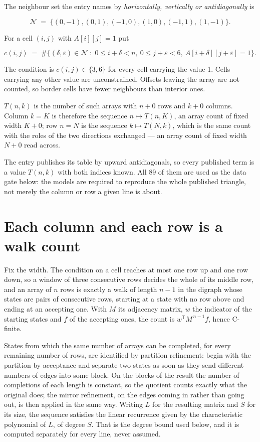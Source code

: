 \documentclass[11pt]{article}
\theoremstyle{definition}
\begin{document}
The neighbour set the entry names by {\itshape horizontally, vertically or antidiagonally} is

\[\mathcal{N} \;=\; \{(0,-1), (0,1), (-1,0), (1,0), (-1,1), (1,-1)\}.\]

For a cell $(i,j)$ with $A[i][j] = 1$ put

\[c(i,j) \;=\; \#\bigl\{(\delta,\varepsilon)\in\mathcal{N} \;:\; 0\le i+\delta<n,\ 0\le j+\varepsilon<6,\ A[i+\delta][j+\varepsilon] = 1\bigr\}.\]

The condition is $c(i,j) \in \{3, 6\}$ for every cell carrying the value 1. Cells carrying any other value are unconstrained. Offsets leaving the array are not counted, so border cells have fewer neighbours than interior ones.

$T(n,k)$ is the number of such arrays with $n + 0$ rows and $k + 0$ columns. Column $k = K$ is therefore the sequence $n \mapsto T(n,K)$, an array count of fixed width $K + 0$; row $n = N$ is the sequence $k \mapsto T(N,k)$, which is the same count with the roles of the two directions exchanged --- an array count of fixed width $N + 0$ read across.

The entry publishes its table by upward antidiagonals, so every published term is a value $T(n,k)$ with both indices known. All 89 of them are used as the data gate below: the models are required to reproduce the whole published triangle, not merely the column or row a given line is about.

\section{Each column and each row is a walk count}

Fix the width. The condition on a cell reaches at most one row up and one row down, so a window of three consecutive rows decides the whole of its middle row, and an array of $n$ rows is exactly a walk of length $n-1$ in the digraph whose states are pairs of consecutive rows, starting at a state with no row above and ending at an accepting one. With $M$ its adjacency matrix, $w$ the indicator of the starting states and $f$ of the accepting ones, the count is $w^{\mathsf T}M^{\,n-1}f$, hence C-finite.

States from which the same number of arrays can be completed, for every remaining number of rows, are identified by partition refinement: begin with the partition by acceptance and separate two states as soon as they send different numbers of edges into some block. On the blocks of the result the number of completions of each length is constant, so the quotient counts exactly what the original does; the mirror refinement, on the edges coming in rather than going out, is then applied in the same way. Writing $L$ for the resulting matrix and $S$ for its size, the sequence satisfies the linear recurrence given by the characteristic polynomial of $L$, of degree $S$. That is the degree bound used below, and it is computed separately for every line, never assumed.
\end{document}
